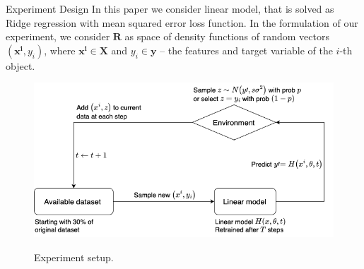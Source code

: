 \documentclass[10pt]{beamer}
\begin{document}
    \begin{frame}{Experiment Design}
        \small
        In this paper we consider linear model, that is solved as Ridge regression with mean squared error loss function. In the formulation of our experiment, we consider $\mathbf{R}$ as space of density functions of random vectors $(\mathbf{x^i}, y_i)$, where $\mathbf{x^i} \in \textbf{X}$ and $y_i \in \textbf{y}$ -- the features and target variable of the $i$-th object.

        \begin{figure}[h!]
            \centering
            \includegraphics[scale = 0.43]{pictures/Experiment_setup.png}
            
            Experiment setup.
            \label{ex_set}
        \end{figure}

        
    \end{frame}
\end{document}
